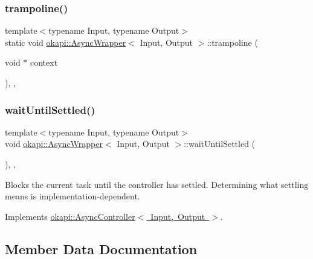 \subsubsection{\texorpdfstring{trampoline()}{trampoline()}}
{\footnotesize\ttfamily template$<$typename Input, typename Output$>$ \\
static void \mbox{\hyperlink{classokapi_1_1AsyncWrapper}{okapi\+::\+Async\+Wrapper}}$<$ Input, Output $>$\+::trampoline (\begin{DoxyParamCaption}\item[{void $\ast$}]{context }\end{DoxyParamCaption})\hspace{0.3cm}{\ttfamily [inline]}, {\ttfamily [static]}, {\ttfamily [protected]}}

\mbox{\label{classokapi_1_1AsyncWrapper_a23435c257ac2d6df59ab5d96408e608a}} 
\subsubsection{\texorpdfstring{waitUntilSettled()}{waitUntilSettled()}}
{\footnotesize\ttfamily template$<$typename Input, typename Output$>$ \\
void \mbox{\hyperlink{classokapi_1_1AsyncWrapper}{okapi\+::\+Async\+Wrapper}}$<$ Input, Output $>$\+::wait\+Until\+Settled (\begin{DoxyParamCaption}{ }\end{DoxyParamCaption})\hspace{0.3cm}{\ttfamily [inline]}, {\ttfamily [override]}, {\ttfamily [virtual]}}

Blocks the current task until the controller has settled. Determining what settling means is implementation-\/dependent. 

Implements \mbox{\hyperlink{classokapi_1_1AsyncController_a20e19f334e3dc7a3092e0e4355edcf49}{okapi\+::\+Async\+Controller$<$ Input, Output $>$}}.



\subsection{Member Data Documentation}
\mbox{\label{classokapi_1_1AsyncWrapper_a0a6e4e3e58a885ce74a2d0f729f679c3}} 
